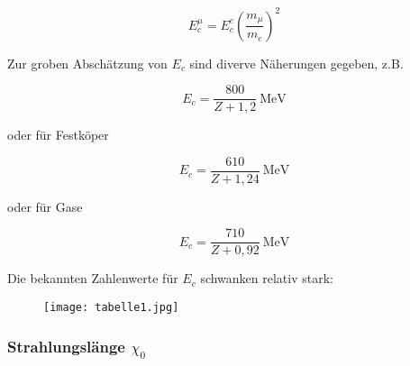 \[E_c^\mu = E_c^e \left( \frac{m_\mu}{m_e} \right)^2 \]

Zur groben Abschätzung von $E_c$ sind diverve Näherungen gegeben, z.B.

\[E_c = \frac{800}{Z+1{},2}~\text{MeV} \]

oder für Festköper

\[E_c = \frac{610}{Z+1{,}24}~\text{MeV} \]

oder für Gase

\[E_c = \frac{710}{Z+0{,}92}~\text{MeV} \]


Die bekannten Zahlenwerte für $E_c$ schwanken relativ stark:

\begin{figure}[H]
	\centering
	\texttt{[image: tabelle1.jpg]}
	\caption{}
	\label{}
\end{figure}

\subsubsection*{Strahlungslänge $\chi_0$}


